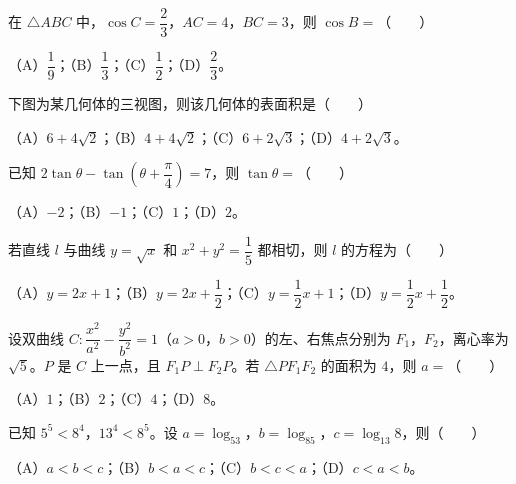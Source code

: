 \begin{question}
在 $\triangle ABC$ 中，$\cos C=\dfrac23$，$AC=4$，$BC=3$，则 $\cos B=$\mbox{（　　）}

（A）$\dfrac19$；（B）$\dfrac13$；（C）$\dfrac12$；（D）$\dfrac23$。

\Needspace{0.4\textheight}
\end{question}
\begin{question}
下图为某几何体的三视图，则该几何体的表面积是\mbox{（　　）}

（A）$6+4\sqrt2$；（B）$4+4\sqrt2$；（C）$6+2\sqrt3$；（D）$4+2\sqrt3$。
\nopagebreak[4]
\begin{center}\end{center}
\nopagebreak[4]
\end{question}
\begin{question}
已知 $2\tan\theta-\tan\left(\theta+\dfrac\pi4\right)=7$，则 $\tan\theta=$\mbox{（　　）}

（A）$-2$；（B）$-1$；（C）$1$；（D）$2$。

\end{question}
\begin{question}
若直线 $l$ 与曲线 $y=\sqrt x$ 和 $x^2+y^2=\dfrac15$ 都相切，则 $l$ 的方程为\mbox{（　　）}

（A）$y=2x+1$；（B）$y=2x+\dfrac12$；（C）$y=\dfrac12x+1$；（D）$y=\dfrac12x+\dfrac12$。

\end{question}
\begin{question}
设双曲线 $C:\dfrac{x^2}{a^2}-\dfrac{y^2}{b^2}=1$（$a>0$，$b>0$）的左、右焦点分别为 $F_1$，$F_2$，离心率为 $\sqrt5$。$P$ 是 $C$ 上一点，且 $F_1P\perp F_2P$。若 $\triangle PF_1F_2$ 的面积为 $4$，则 $a=$\mbox{（　　）}

（A）$1$；（B）$2$；（C）$4$；（D）$8$。

\end{question}
\begin{question}
已知 $5^5<8^4$，$13^4<8^5$。设 $a=\log_53$，$b=\log_85$，$c=\log_{13}8$，则\mbox{（　　）}

（A）$a<b<c$；（B）$b<a<c$；（C）$b<c<a$；（D）$c<a<b$。

\end{question}

